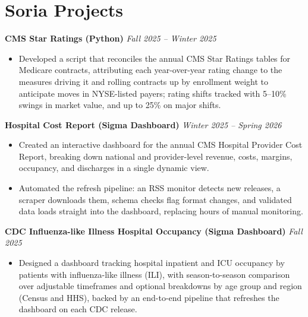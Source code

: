 \documentclass[10pt,letterpaper]{article}
\begin{document}
\section*{Soria Projects}

\noindent \textbf{CMS Star Ratings (Python)} \hfill \textit{Fall 2025 -- Winter 2025}
\begin{itemize}[noitemsep, topsep=2pt]
    \item Developed a script that reconciles the annual CMS Star Ratings tables for Medicare contracts, attributing each year-over-year rating change to the measures driving it and rolling contracts up by enrollment weight to anticipate moves in NYSE-listed payers; rating shifts tracked with 5--10\% swings in market value, and up to 25\% on major shifts.
\end{itemize}

\vspace{1pt}

\noindent \textbf{Hospital Cost Report (Sigma Dashboard)} \hfill \textit{Winter 2025 -- Spring 2026}
\begin{itemize}[noitemsep, topsep=2pt]
    \item Created an interactive dashboard for the annual CMS Hospital Provider Cost Report, breaking down national and provider-level revenue, costs, margins, occupancy, and discharges in a single dynamic view.
    \item Automated the refresh pipeline: an RSS monitor detects new releases, a scraper downloads them, schema checks flag format changes, and validated data loads straight into the dashboard, replacing hours of manual monitoring.
\end{itemize}

\vspace{1pt}

\noindent \textbf{CDC Influenza-like Illness Hospital Occupancy (Sigma Dashboard)} \hfill \textit{Fall 2025}
\begin{itemize}[noitemsep, topsep=2pt]
    \item Designed a dashboard tracking hospital inpatient and ICU occupancy by patients with influenza-like illness (ILI), with season-to-season comparison over adjustable timeframes and optional breakdowns by age group and region (Census and HHS), backed by an end-to-end pipeline that refreshes the dashboard on each CDC release.
\end{itemize}

\vspace{1pt}
\end{document}
